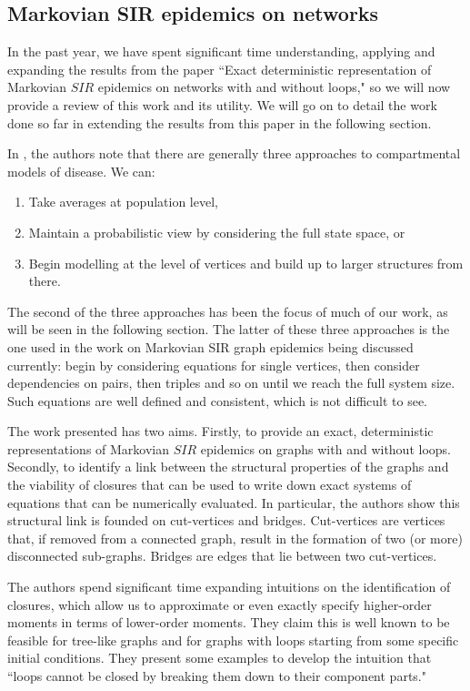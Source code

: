 \documentclass[../report.tex]{subfiles}
\begin{document}

\subsection{Markovian SIR epidemics on networks}

In the past year, we have spent significant time understanding, applying and expanding the results from the paper ``Exact deterministic representation of Markovian ${SIR}$ epidemics on networks with and without loops," \cite{kiss_2014} so we will now provide a review of this work and its utility. We will go on to detail the work done so far in extending the results from this paper in the following section.

In \cite{kiss_2014}, the authors note that there are generally three approaches to compartmental models of disease. We can:
\begin{enumerate}
	\item Take averages at population level, 
	\item Maintain a probabilistic view by considering the full state space, or
	\item Begin modelling at the level of vertices and build up to larger structures from there.
\end{enumerate}

The second of the three approaches has been the focus of much of our work, as will be seen in the following section. The latter of these three approaches is the one used in the work on Markovian SIR graph epidemics being discussed currently: begin by considering equations for single vertices, then consider dependencies on pairs, then triples and so on until we reach the full system size. Such equations are well defined and consistent, which is not difficult to see.

The work presented has two aims. Firstly, to provide an exact, deterministic representations of Markovian $SIR$ epidemics on graphs with and without loops. Secondly, to identify a link between the structural properties of the graphs and the viability of closures that can be used to write down exact systems of equations that can be numerically evaluated. In particular, the authors show this structural link is founded on cut-vertices and bridges. Cut-vertices are vertices that, if removed from a connected graph, result in the formation of two (or more) disconnected sub-graphs. Bridges are edges that lie between two cut-vertices.

The authors spend significant time expanding intuitions on the identification of closures, which allow us to approximate or even exactly specify higher-order moments in terms of lower-order moments. They claim this is well known to be feasible for tree-like graphs and for graphs with loops starting from some specific initial conditions. They present some examples to develop the intuition that ``loops cannot be closed by breaking them down to their component parts."
\end{document}
